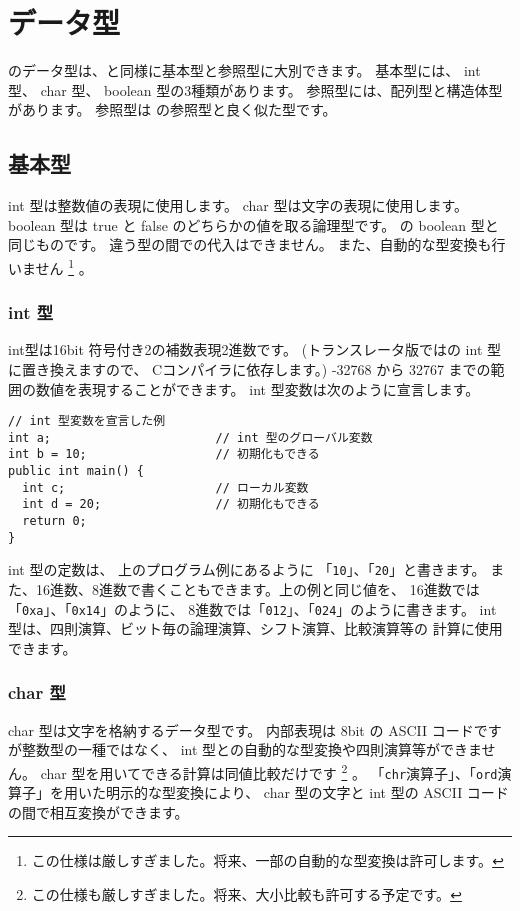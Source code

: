 \section{データ型}

\cmml のデータ型は、\javal と同様に基本型と参照型に大別できます。
基本型には、 int 型、 char 型、 boolean 型の3種類があります。
参照型には、配列型と構造体型があります。
参照型は \javal の参照型と良く似た型です。

\subsection{基本型}

int 型は整数値の表現に使用します。
char 型は文字の表現に使用します。
boolean 型は true と false のどちらかの値を取る論理型です。
\javal の boolean 型と同じものです。
違う型の間での代入はできません。
また、自動的な型変換も行いません
\footnote{この仕様は厳しすぎました。将来、一部の自動的な型変換は許可します。}
。

\subsubsection{int 型}
int型は16bit 符号付き2の補数表現2進数です。
(トランスレータ版では\cl の int 型に置き換えますので、
Cコンパイラに依存します。)
-32768 から 32767 までの範囲の数値を表現することができます。
int 型変数は次のように宣言します。

\begin{mylist}
\begin{verbatim}
// int 型変数を宣言した例
int a;                       // int 型のグローバル変数
int b = 10;                  // 初期化もできる
public int main() {
  int c;                     // ローカル変数
  int d = 20;                // 初期化もできる
  return 0;
}
\end{verbatim}
\end{mylist}

int 型の定数は、
上のプログラム例にあるように 「\verb/10/」、「\verb/20/」と書きます。
また、16進数、8進数で書くこともできます。上の例と同じ値を、
16進数では「\verb/0xa/」、「\verb/0x14/」のように、
8進数では「\verb/012/」、「\verb/024/」のように書きます。
int 型は、四則演算、ビット毎の論理演算、シフト演算、比較演算等の
計算に使用できます。

\subsubsection{char 型}
char 型は文字を格納するデータ型です。
内部表現は 8bit の ASCII コードですが整数型の一種ではなく、
int 型との自動的な型変換や四則演算等ができません。
char 型を用いてできる計算は同値比較だけです
\footnote{この仕様も厳しすぎました。将来、大小比較も許可する予定です。}
。
「\verb/chr/演算子」、「\verb/ord/演算子」を用いた明示的な型変換により、
char 型の文字と int 型の ASCII コードの間で相互変換ができます。

